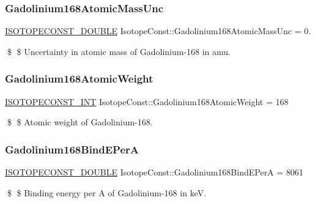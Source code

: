 \subsubsection{\texorpdfstring{Gadolinium168\+Atomic\+Mass\+Unc}{Gadolinium168AtomicMassUnc}}
{\footnotesize\ttfamily \mbox{\hyperlink{group___isotope_const-_macros_ga8f45a7272ce02c0b4c65c44636ed719a}{I\+S\+O\+T\+O\+P\+E\+C\+O\+N\+S\+T\+\_\+\+D\+O\+U\+B\+LE}} Isotope\+Const\+::\+Gadolinium168\+Atomic\+Mass\+Unc = 0.}

\$ \$ Uncertainty in atomic mass of Gadolinium-\/168 in amu. \mbox{\label{group___isotope_const-_gadolinium-_gd168_ga4c5ace7202baaad3aad48ca8505395f2}} 
\subsubsection{\texorpdfstring{Gadolinium168\+Atomic\+Weight}{Gadolinium168AtomicWeight}}
{\footnotesize\ttfamily \mbox{\hyperlink{group___isotope_const-_macros_ga5f18360b3e99483a35c32d789e62621c}{I\+S\+O\+T\+O\+P\+E\+C\+O\+N\+S\+T\+\_\+\+I\+NT}} Isotope\+Const\+::\+Gadolinium168\+Atomic\+Weight = 168}

\$ \$ Atomic weight of Gadolinium-\/168. \mbox{\label{group___isotope_const-_gadolinium-_gd168_gacbcf02c167c53ab4edf6e25e03b4d318}} 
\subsubsection{\texorpdfstring{Gadolinium168\+Bind\+E\+PerA}{Gadolinium168BindEPerA}}
{\footnotesize\ttfamily \mbox{\hyperlink{group___isotope_const-_macros_ga8f45a7272ce02c0b4c65c44636ed719a}{I\+S\+O\+T\+O\+P\+E\+C\+O\+N\+S\+T\+\_\+\+D\+O\+U\+B\+LE}} Isotope\+Const\+::\+Gadolinium168\+Bind\+E\+PerA = 8061}

\$ \$ Binding energy per A of Gadolinium-\/168 in keV. \mbox{\label{group___isotope_const-_gadolinium-_gd168_ga641890cdae73b7684db0d4c704696142}} 
